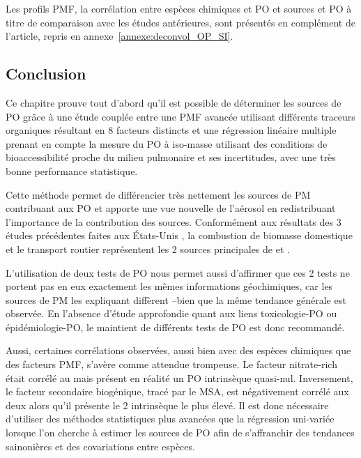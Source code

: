 Les profils PMF, la corrélation entre espèces chimiques et PO et sources et
PO à titre de comparaison avec les études antérieures, sont présentés en complément de
l'article, repris en annexe~\ref{annexe:deconvol_OP_SI}.




\subsection{Conclusion}

Ce chapitre prouve tout d'abord qu'il est possible de déterminer les sources de PO grâce à
une étude couplée entre une PMF avancée utilisant différents traceurs organiques résultant
en 8 facteurs distincts et une régression linéaire multiple prenant en compte
la mesure du PO à iso-masse utilisant des conditions de bioaccessibilité proche du milieu
pulmonaire et ses incertitudes, avec une très bonne performance statistique.

Cette méthode permet de différencier très nettement les sources de PM contribuant aux PO
et apporte une vue nouvelle de l'aérosol en redistribuant l'importance de la contribution
des sources. Conformément aux résultats des 3 études précédentes faites aux États-Unis
\autocite{vermaReactive2014,batesReactive2015,fangOxidative2016}, la combustion de
biomasse domestique et le transport routier représentent les 2 sources principales de
\POAAv{} et \PODTTv.

L'utilisation de deux tests de PO nous permet aussi d'affirmer que ces 2 tests ne portent
pas en eux exactement les mêmes informations géochimiques, car les sources de PM les
expliquant diffèrent --bien que la même tendance générale est observée. En l'absence
d'étude approfondie quant aux liens toxicologie-PO ou épidémiologie-PO, le maintient de
différents tests de PO est donc recommandé.

Aussi, certaines corrélations observées, aussi bien avec des espèces chimiques que des
facteurs PMF, s'avère comme attendue trompeuse. Le facteur nitrate-rich était corrélé au
\POAAv{} mais présent en réalité un PO intrinsèque quasi-nul. Inversement, le facteur
secondaire biogénique, tracé par le MSA, est négativement corrélé aux deux \OPv{} alors
qu'il présente le 2\ieme{} \PODTT{} intrinsèque le plus élevé. Il est donc nécessaire
d'utiliser des méthodes statistiques plus avancées que la régression uni-variée lorsque
l'on cherche à estimer les sources de PO afin de s'affranchir des tendances sainonières et
des covariations entre espèces.

